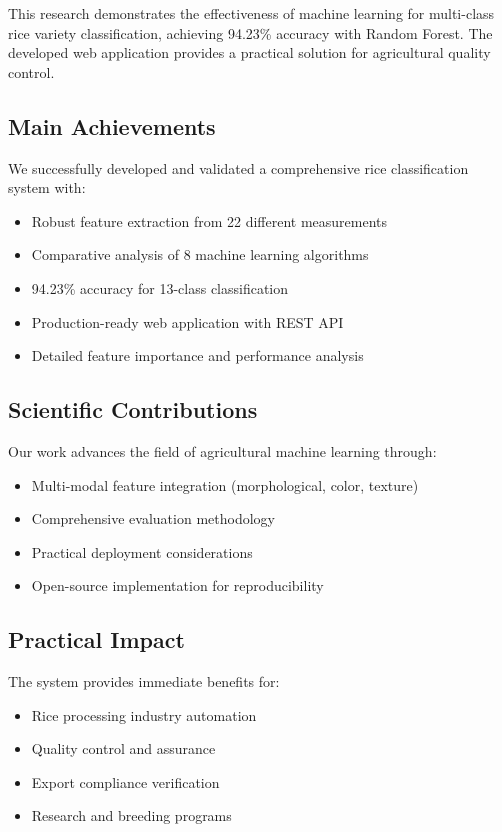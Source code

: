 \documentclass[conference]{IEEEtran}
\begin{document}
This research demonstrates the effectiveness of machine learning for multi-class rice variety classification, achieving 94.23\% accuracy with Random Forest. The developed web application provides a practical solution for agricultural quality control.

\subsection{Main Achievements}

We successfully developed and validated a comprehensive rice classification system with:
\begin{itemize}
    \item Robust feature extraction from 22 different measurements
    \item Comparative analysis of 8 machine learning algorithms
    \item 94.23\% accuracy for 13-class classification
    \item Production-ready web application with REST API
    \item Detailed feature importance and performance analysis
\end{itemize}

\subsection{Scientific Contributions}

Our work advances the field of agricultural machine learning through:
\begin{itemize}
    \item Multi-modal feature integration (morphological, color, texture)
    \item Comprehensive evaluation methodology
    \item Practical deployment considerations
    \item Open-source implementation for reproducibility
\end{itemize}

\subsection{Practical Impact}

The system provides immediate benefits for:
\begin{itemize}
    \item Rice processing industry automation
    \item Quality control and assurance
    \item Export compliance verification
    \item Research and breeding programs
\end{itemize}
\end{document}
